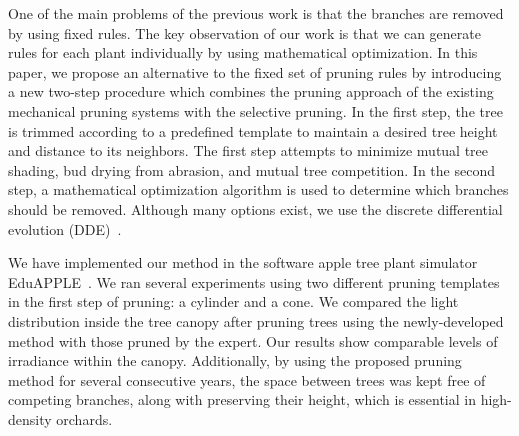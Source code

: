 One of the main problems of the previous work is that the branches are
removed by using fixed rules. The key observation of our work is
that we can generate rules for each plant individually by using mathematical optimization.
In this paper, we propose an alternative
to the fixed set of pruning rules by introducing a new two-step
procedure which combines the pruning approach of the existing mechanical
pruning systems with the selective pruning. In the first step, the tree
is trimmed according to a predefined template to maintain a desired
tree height and distance to its neighbors. The first step attempts to minimize mutual tree shading, bud drying from abrasion, and mutual tree competition.
In the second step, a mathematical optimization algorithm is used to determine which branches should be removed. Although many options exist, we use 
the discrete differential evolution (DDE)~\cite{strnad_novel_2017}. 

We have implemented our method in the software apple tree plant simulator EduAPPLE~\cite{kohek_eduapple:_2015}. We ran several experiments using two different pruning templates in the first
step of pruning: a cylinder and a cone. 
We compared the light distribution inside the tree canopy after pruning trees using the
newly-developed method with those pruned by the expert.
Our results show comparable levels of irradiance within the canopy.
Additionally, by using the proposed pruning method for several consecutive
years, the space between trees was kept free of competing branches, along with preserving their height, which is essential in high-density orchards.
